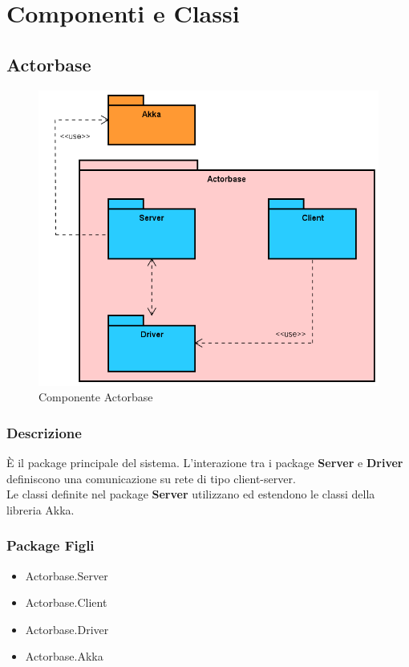 \documentclass[a4paper]{article}
\begin{document}
	\newpage 
	\section{Componenti e Classi}
		\subsection{Actorbase}
			\begin{figure} [H]
			\centering
			\includegraphics[scale=0.50]{Server/Package/actorbase.png}
			\caption{Componente Actorbase}
		\end{figure}
			\subsubsection{Descrizione}
				È il package principale del sistema. L'interazione tra i package \textbf{Server} e \textbf{Driver} definiscono una comunicazione su rete di tipo client-server. \\ Le classi definite nel package \textbf{Server} utilizzano ed estendono le classi della libreria Akka.
			\subsubsection{Package Figli}
				\begin{itemize}
					\item Actorbase.Server
					\item Actorbase.Client
					\item Actorbase.Driver
					\item Actorbase.Akka
				\end{itemize}
\end{document}

